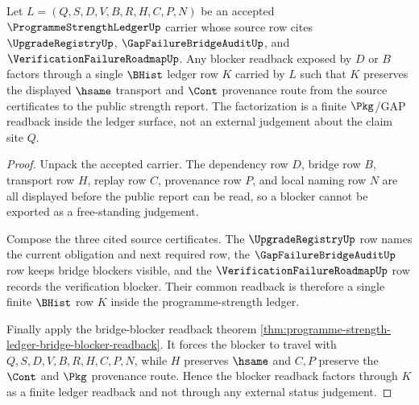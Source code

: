 \begin{theorem}
\label{thm:programme-strength-ledger-blocker-readback-factorization}
Let $L=(Q,S,D,V,B,R,H,C,P,N)$ be an accepted $\ProgrammeStrengthLedgerUp$
carrier whose source row cites $\UpgradeRegistryUp$, $\GapFailureBridgeAuditUp$,
and $\VerificationFailureRoadmapUp$. Any blocker readback exposed by $D$ or $B$
factors through a single $\BHist$ ledger row $K$ carried by $L$ such that $K$
preserves the displayed $\hsame$ transport and $\Cont$ provenance route from
the source certificates to the public strength report. The factorization is a
finite $\Pkg$/GAP readback inside the ledger surface, not an external judgement
about the claim site $Q$.
\end{theorem}
\begin{proof}
Unpack the accepted carrier. The dependency row $D$, bridge row $B$, transport
row $H$, replay row $C$, provenance row $P$, and local naming row $N$ are all
displayed before the public report can be read, so a blocker cannot be exported
as a free-standing judgement.

Compose the three cited source certificates. The $\UpgradeRegistryUp$ row names
the current obligation and next required row, the $\GapFailureBridgeAuditUp$ row
keeps bridge blockers visible, and the $\VerificationFailureRoadmapUp$ row
records the verification blocker. Their common readback is therefore a single
finite $\BHist$ row $K$ inside the programme-strength ledger.

Finally apply the bridge-blocker readback theorem
\autoref{thm:programme-strength-ledger-bridge-blocker-readback}. It forces the
blocker to travel with $Q,S,D,V,B,R,H,C,P,N$, while $H$ preserves $\hsame$ and
$C,P$ preserve the $\Cont$ and $\Pkg$ provenance route. Hence the blocker
readback factors through $K$ as a finite ledger readback and not through any
external status judgement.
\end{proof}

